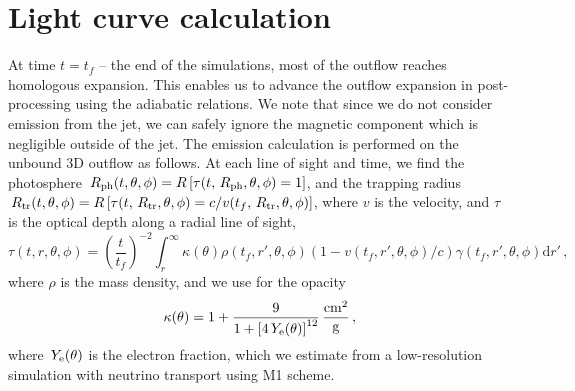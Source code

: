 \documentclass[twocolumn,dvipsnames]{aastex62}
\newcommand{\rph}{\,{R_{\rm ph}}}
\newcommand{\rtr}{\,{R_{\rm tr}}}
\newcommand{\Ye}{\,{Y_{\rm e}}}
\begin{document}


\appendix

\section{Light curve calculation}\label{sec:app}

At time $ t = t_f $ -- the end of the simulations, most of the outflow reaches homologous expansion. This enables us to advance the outflow expansion in post-processing using the adiabatic relations. We note that since we do not consider emission from the jet, we can safely ignore the magnetic component which is negligible outside of the jet. The emission calculation is performed on the unbound 3D outflow as follows.
At each line of sight and time, we find the photosphere $ \rph(t,\theta,\phi)=R\left[\tau(t,\rph,\theta,\phi)=1\right] $, and the trapping radius $ \rtr(t,\theta,\phi)=R\left[\tau(t,\rtr,\theta,\phi)=c/v(t_f,\rtr,\theta,\phi)\right] $, where $ v $ is the velocity, and $ \tau $ is the optical depth along a radial line of sight,
\begin{equation}\label{eq:tau}
    \tau(t,r,\theta,\phi) = \left(\frac{t}{t_f}\right)^{-2}\int_{r}^{\infty}\kappa(\theta)\rho(t_f,r',\theta,\phi)(1-v(t_f,r',\theta,\phi)/c)\gamma(t_f,r',\theta,\phi)\mathrm{d}r'\,,
\end{equation}
where $ \rho $ is the mass density, and we use for the opacity \citep{Wu2022}
\begin{equation}\label{eq:kappa}
    \kappa(\theta) = 1+\frac{9}{1+\left[4\Ye(\theta)\right]^{12}}\,{\rm \frac{cm^2}{g}}\,,
\end{equation}
where $ \Ye(\theta) $ is the electron fraction, which we estimate from a low-resolution simulation with neutrino transport using M1 scheme.
\end{document}
